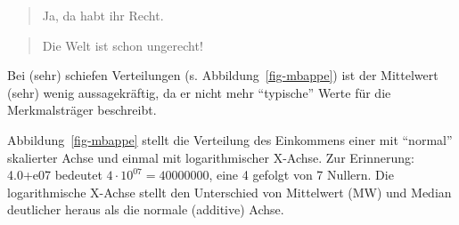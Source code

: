 \documentclass[
  letterpaper,
]{scrbook}
\theoremstyle{definition}
\theoremstyle{definition}
\theoremstyle{definition}
\theoremstyle{remark}
\begin{document}
\begin{quote}
{} Ja, da habt ihr Recht.
\end{quote}

\begin{quote}
{} Die Welt ist schon ungerecht!
\end{quote}

\begin{tcolorbox}[enhanced jigsaw, colbacktitle=quarto-callout-important-color!10!white, coltitle=black, bottomrule=.15mm, rightrule=.15mm, arc=.35mm, toptitle=1mm, colframe=quarto-callout-important-color-frame, opacitybacktitle=0.6, left=2mm, leftrule=.75mm, breakable, opacityback=0, bottomtitle=1mm, titlerule=0mm, title=\textcolor{quarto-callout-important-color}{\faExclamation}\hspace{0.5em}{Wichtig}, colback=white, toprule=.15mm]

Bei (sehr) schiefen Verteilungen (s. Abbildung~\ref{fig-mbappe}) ist der
Mittelwert (sehr) wenig aussagekräftig, da er nicht mehr ``typische''
Werte für die Merkmalsträger beschreibt.

\end{tcolorbox}

Abbildung~\ref{fig-mbappe} stellt die Verteilung des Einkommens einer
mit ``normal'' skalierter Achse und einmal mit logarithmischer X-Achse.
Zur Erinnerung: 4.0+e07 bedeutet \(4 \cdot 10^{07} = 40000000\), eine 4
gefolgt von 7 Nullern. Die logarithmische X-Achse stellt den Unterschied
von Mittelwert (MW) und Median deutlicher heraus als die normale
(additive) Achse.
\end{document}
